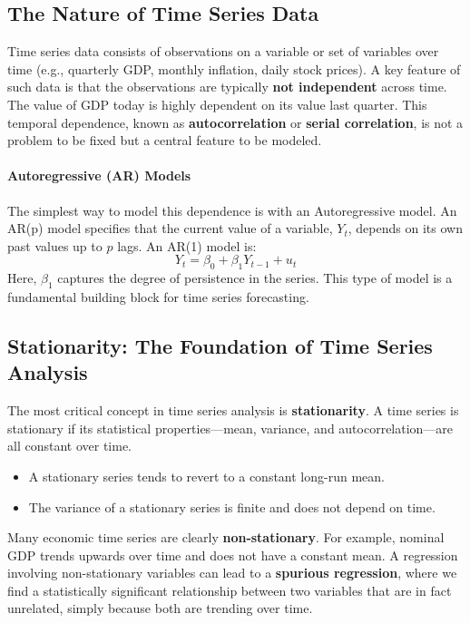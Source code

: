 \documentclass{article}
\providecommand{\tightlist}{
  \setlength{\itemsep}{0pt}
  \setlength{\parskip}{0pt}}
\begin{document}
\subsection{The Nature of Time Series Data}
\label{sub:ts_nature}

Time series data consists of observations on a variable or set of variables over time (e.g., quarterly GDP, monthly inflation, daily stock prices). A key feature of such data is that the observations are typically \textbf{not independent} across time. The value of GDP today is highly dependent on its value last quarter. This temporal dependence, known as \textbf{autocorrelation} or \textbf{serial correlation}, is not a problem to be fixed but a central feature to be modeled.

\paragraph{Autoregressive (AR) Models}
The simplest way to model this dependence is with an Autoregressive model. An AR(p) model specifies that the current value of a variable, $Y_t$, depends on its own past values up to $p$ lags. An AR(1) model is:
\begin{equation}
    Y_t = \beta_0 + \beta_1 Y_{t-1} + u_t
\end{equation}
Here, $\beta_1$ captures the degree of persistence in the series. This type of model is a fundamental building block for time series forecasting.

\subsection{Stationarity: The Foundation of Time Series Analysis}
\label{sub:stationarity}

The most critical concept in time series analysis is \textbf{stationarity}. A time series is stationary if its statistical properties—mean, variance, and autocorrelation—are all constant over time.
\begin{itemize}
    \tightlist
    \item A stationary series tends to revert to a constant long-run mean.
    \item The variance of a stationary series is finite and does not depend on time.
\end{itemize}
Many economic time series are clearly \textbf{non-stationary}. For example, nominal GDP trends upwards over time and does not have a constant mean. A regression involving non-stationary variables can lead to a \textbf{spurious regression}, where we find a statistically significant relationship between two variables that are in fact unrelated, simply because both are trending over time.
\end{document}
